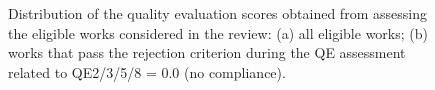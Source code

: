 \begin{figure}[h]
  \centering
  \linebreak
  \caption{Distribution of the quality evaluation scores obtained from assessing the eligible works considered in the review: (a) all eligible works; (b) works that pass the rejection criterion during the QE assessment related to QE2/3/5/8 = 0.0 (no compliance).}
  \label{fig:methodology:qe}
\end{figure}

